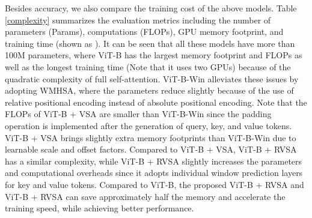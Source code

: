 \documentclass[10pt, journal,twoside]{IEEEtran}
\begin{document}
Besides accuracy, we also compare the training cost of the above models. Table \ref{complexity} summarizes the evaluation metrics including the number of parameters (Params), computations (FLOPs), GPU memory footprint, and training time (shown as ). It can be seen that all these models have more than 100M parameters, where ViT-B has the largest memory footprint and FLOPs as well as the longest training time (Note that it uses two GPUs) because of the quadratic complexity of full self-attention. ViT-B-Win alleviates these issues by adopting WMHSA, where the parameters reduce slightly because of the use of relative positional encoding instead of absolute positional encoding. Note that the FLOPs of ViT-B + VSA are smaller than ViT-B-Win since the padding operation is implemented after the generation of query, key, and value tokens. ViT-B + VSA brings slightly extra memory footprints than ViT-B-Win due to learnable scale and offset factors. Compared to ViT-B + VSA, ViT-B + RVSA has a similar complexity, while ViT-B + RVSA slightly increases the parameters and computational overheads since it adopts individual window prediction layers for key and value tokens. Compared to ViT-B, the proposed ViT-B + RVSA and ViT-B + RVSA can save approximately half the memory and accelerate the training speed, while achieving better performance.
\end{document}
